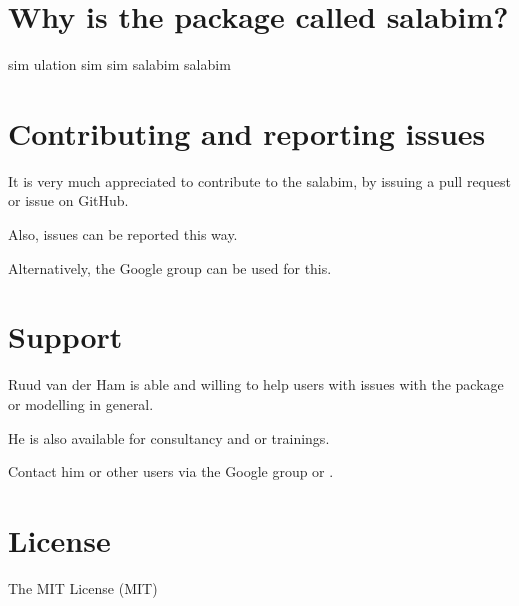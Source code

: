 \documentclass[letterpaper,10pt,english]{sphinxmanual}
\begin{document}
\section{Why is the package called salabim?}
\label{\detokenize{About:why-is-the-package-called-salabim}}
\begin{sphinxVerbatim}[commandchars=\\\{\}]
  
  \PYG{p}{[}\PYG{p}{]}
  
      \PYG{p}{[}\PYG{p}{]}
\end{sphinxVerbatim}

\begin{sphinxVerbatim}[commandchars=\\\{\}]
sim ulation
sim
sim salabim
    salabim
\end{sphinxVerbatim}


\section{Contributing and reporting issues}
\label{\detokenize{About:contributing-and-reporting-issues}}
It is very much appreciated to contribute to the salabim, by issuing a pull request or issue on GitHub.

Also, issues can be reported this way.

Alternatively, the Google group can be used for this.


\section{Support}
\label{\detokenize{About:support}}
Ruud van der Ham is able and willing to help users with issues with the package or modelling in general.

He is also available for consultancy and or trainings.

Contact him or other users via the Google group or .


\section{License}
\label{\detokenize{About:license}}
The MIT License (MIT)
\end{document}
